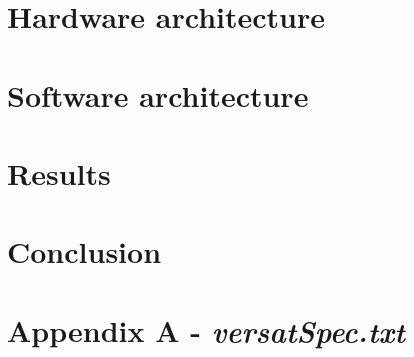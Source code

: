 \documentclass[10pt]{esda}
\begin{document}
\cleardoublepage
\section{Hardware architecture}
\label{sec:hw}


\cleardoublepage
\section{Software architecture}
\label{sec:sw}


\cleardoublepage
\section{Results}
\label{sec:results}


\cleardoublepage
\section{Conclusion}
\label{sec:conc}


\cleardoublepage
{}
\renewcommand{\refname}{Bibliography}




\cleardoublepage

\section*{Appendix A - \textbf{\textit{versatSpec.txt}}}
\appendix

\end{document}
